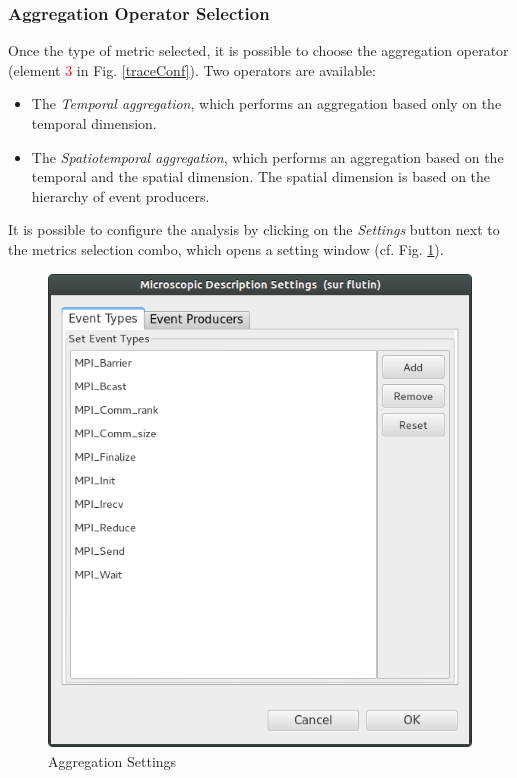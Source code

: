 \documentclass[twoside]{article}
\begin{document}
\begin{sloppypar}
\subsubsection{Aggregation Operator Selection}
Once the type of metric selected, it is possible to choose the aggregation operator (element \textcolor{red}{3} in Fig. \ref{traceConf}). Two operators are available:
\begin{itemize}
	\item The \textit{Temporal aggregation}, which performs an aggregation based only on the temporal dimension.
	\item The \textit{Spatiotemporal aggregation}, which performs an aggregation based on the temporal and the spatial dimension. The spatial dimension is based on the hierarchy of event producers.
\end{itemize}

It is possible to configure the analysis by clicking on the \textit{Settings} button next to the metrics selection combo, which opens a setting window (cf. Fig. \ref{microSettings}).

\begin{figure}[h!]
	\centering
	\includegraphics[scale=0.4]{images/state_settings.png}
	\caption{Aggregation Settings}
	\label{microSettings}
\end{figure}


\end{sloppypar}
\end{document}
